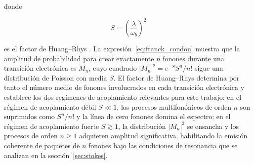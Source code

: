 donde

\begin{equation}
	S = \left(\frac{\lambda}{\omega_b}\right)^2
	\label{eq:huang_rhys}
\end{equation}

es el factor de Huang--Rhys \cite{huang1950}. La expresión~\eqref{eq:franck_condon} muestra que la amplitud de probabilidad para crear exactamente $n$ fonones durante una transición electrónica es $M_n$, cuyo cuadrado $|M_n|^2 = e^{-S}S^n/n!$ sigue una distribución de Poisson con media $S$. El factor de Huang--Rhys determina por tanto el número medio de fonones involucrados en cada transición electrónica y establece los dos regímenes de acoplamiento relevantes para este trabajo: en el régimen de acoplamiento débil $S \ll 1$, los procesos multifonónicos de orden $n$ son suprimidos como $S^n/n!$ y la línea de cero fonones domina el espectro; en el régimen de acoplamiento fuerte $S \gtrsim 1$, la distribución $|M_n|^2$ se ensancha y los procesos de orden $n \geq 1$ adquieren amplitud significativa, habilitando la emisión coherente de paquetes de $n$ fonones bajo las condiciones de resonancia que se analizan en la sección~\ref{sec:stokes}.

